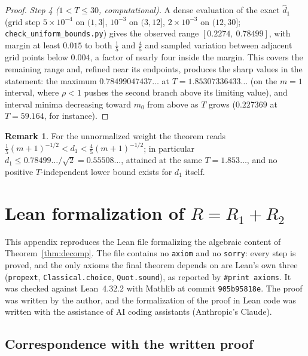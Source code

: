 \documentclass[11pt]{article}
\theoremstyle{definition}
\newtheorem{remark}[theorem]{Remark}
\begin{document}
\begin{proof}
\emph{Step 4 ($1<T\leq30$, computational).} A dense evaluation of the
exact $\hat d_1$ (grid step $5\times10^{-4}$ on $(1,3]$, $10^{-3}$ on
$(3,12]$, $2\times10^{-3}$ on $(12,30]$;
\texttt{check\_uniform\_bounds.py}) gives the observed range
$[0.2274,\ 0.78499]$, with margin at
least $0.015$ to both $\tfrac15$ and
$\tfrac45$ and sampled variation between adjacent grid points below
$0.004$, a factor of nearly four inside the margin. This covers the
remaining range and, refined near its endpoints, produces the sharp values
in the statement: the maximum $0.78499047437\ldots$ at
$T=1.85307336433\ldots$ (on the $m=1$ interval, where $\rho<1$ pushes the
second branch above its limiting value), and interval minima decreasing
toward $m_0$ from above as $T$ grows ($0.227369$ at $T=59.164$, for
instance).
\end{proof}

\begin{remark}
For the unnormalized weight the theorem reads
$\tfrac15(m+1)^{-1/2}<d_1<\tfrac45(m+1)^{-1/2}$; in particular
$d_1\leq0.78499\ldots/\sqrt2=0.55508\ldots$, attained at the same
$T=1.853\ldots$, and no positive $T$-independent lower bound exists for
$d_1$ itself.
\end{remark}

\clearpage

\section{Lean formalization of \texorpdfstring{$R=R_{1}+R_{2}$}{R = R1 + R2}}
\label{app:lean-decomp}

This appendix reproduces the Lean file formalizing the algebraic content of
Theorem~\ref{thm:decomp}. The file contains no \texttt{axiom} and no
\texttt{sorry}: every step is proved, and the only axioms the final theorem
depends on are Lean's own three (\texttt{propext},
\texttt{Classical.choice}, \texttt{Quot.sound}), as reported by
\texttt{\#print axioms}. It was checked against Lean~4.32.2 with Mathlib at
commit \texttt{905b95818e}. The proof was written by the author, and the
formalization of the proof in Lean code was written with the assistance of
AI coding assistants (Anthropic's Claude).

\subsection{Correspondence with the written proof}
\end{document}
